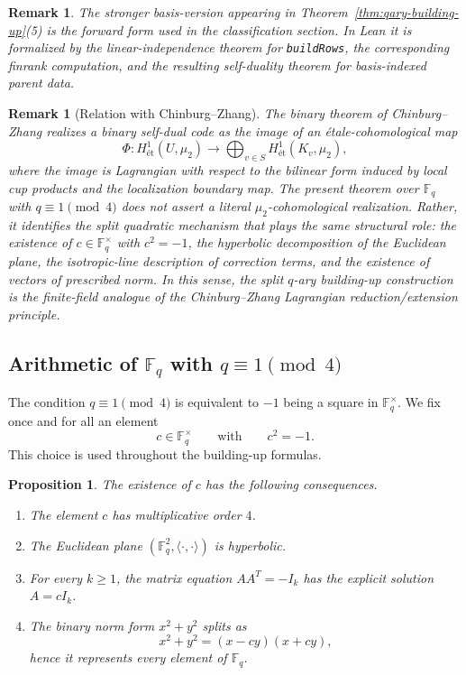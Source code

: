 \documentclass[12pt]{article}
\newtheorem{prop}[theorem]{Proposition}
\newtheorem{remark}[theorem]{Remark}
\newcommand{\F}{\mathbb{F}}
\newcommand{\et}{\mathrm{ét}}
\begin{document}
\begin{remark}
{\rm
The stronger basis-version appearing in Theorem~\ref{thm:qary-building-up}(5) is the forward form used in the classification section. In Lean it is formalized by the linear-independence theorem for \texttt{buildRows}, the corresponding finrank computation, and the resulting self-duality theorem for basis-indexed parent data.
}
\end{remark}

\medskip

\begin{remark}[Relation with Chinburg--Zhang]
{\rm
The binary theorem of Chinburg--Zhang realizes a binary self-dual code as the image of an \'etale-cohomological map
\[
\Phi : H^1_{\et}(U,\mu_2) \longrightarrow \bigoplus_{v\in S} H^1_{\et}(K_v,\mu_2),
\]
where the image is Lagrangian with respect to the bilinear form induced by local cup products and the localization boundary map.
The present theorem over $\mathbb{F}_q$ with $q \equiv 1 \pmod{4}$ does not assert a literal $\mu_2$-cohomological realization.
Rather, it identifies the split quadratic mechanism that plays the same structural role: the existence of $c \in \mathbb{F}_q^\times$ with $c^2=-1$, the hyperbolic decomposition of the Euclidean plane, the isotropic-line description of correction terms, and the existence of vectors of prescribed norm.
In this sense, the split $q$-ary building-up construction is the finite-field analogue of the Chinburg--Zhang Lagrangian reduction/extension principle.
}
\end{remark}



\subsection{Arithmetic of \texorpdfstring{$\F_q$}{Fq} with \texorpdfstring{$q \equiv 1 \pmod{4}$}{q = 1 (mod 4)}}

The condition $q \equiv 1 \pmod 4$ is equivalent to $-1$ being a square in $\F_q^\times$. We fix once and for all an element
\[
c \in \F_q^\times \qquad \text{with} \qquad c^2 = -1.
\]
This choice is used throughout the building-up formulas.

\begin{prop}\label{prop:split-consequences}
The existence of $c$ has the following consequences.
\begin{enumerate}[label=(\roman*)]
\item The element $c$ has multiplicative order $4$.
\item The Euclidean plane $(\F_q^2,\langle \cdot,\cdot\rangle)$ is hyperbolic.
\item For every $k \ge 1$, the matrix equation $AA^T = -I_k$ has the explicit solution $A=cI_k$.
\item The binary norm form $x^2+y^2$ splits as
\[
x^2+y^2 = (x-cy)(x+cy),
\]
hence it represents every element of\/ $\F_q$.
\end{enumerate}
\end{prop}
\end{document}
